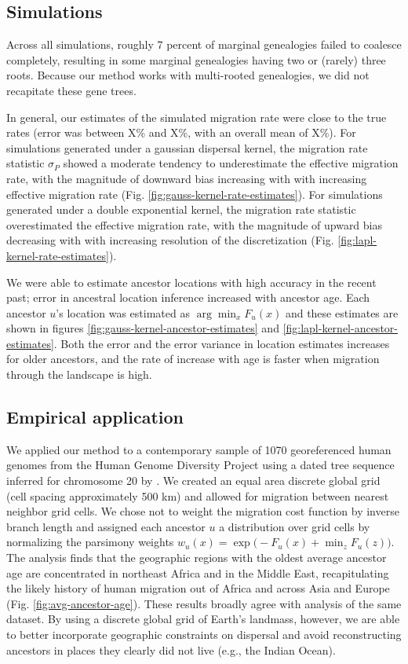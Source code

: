 \subsection{Simulations}

Across all simulations, roughly 7 percent of marginal genealogies failed to
coalesce completely, resulting in some marginal genealogies having two or (rarely)
three roots. Because our method works with multi-rooted genealogies, we did
not recapitate these gene trees.

In general, our estimates of the simulated migration rate were close to the 
true rates (error was between X\% and X\%, with an overall mean of X\%).
For simulations generated under a gaussian dispersal kernel, the migration
rate statistic $\sigma_P$ showed a moderate tendency to underestimate the 
effective migration rate, with the magnitude of downward bias increasing with 
with increasing effective migration rate 
(Fig. \ref{fig:gauss-kernel-rate-estimates}). For simulations generated under
a double exponential kernel, the migration rate statistic overestimated the
effective migration rate, with the magnitude of upward bias decreasing with 
with increasing resolution of the discretization
(Fig. \ref{fig:lapl-kernel-rate-estimates}).

We were able to estimate ancestor locations with high accuracy in the recent past; 
error in ancestral location inference increased with ancestor age.
Each ancestor $u$'s location was estimated as $\arg\min_x F_u(x)$ and these
estimates are shown in figures \ref{fig:gauss-kernel-ancestor-estimates} and 
\ref{fig:lapl-kernel-ancestor-estimates}. Both the error and the error variance
in location estimates increases for older ancestors, and the rate of increase
with age is faster when migration through the landscape is high. 

\subsection{Empirical application}

We applied our method to a contemporary sample of 1070 georeferenced human
genomes from the Human Genome Diversity Project using a dated tree sequence
inferred for chromosome 20 by \citet{Wohns_etal_2022}. We created an equal 
area discrete global grid \citep{Barnes_Sahr_2023} (cell spacing approximately 
500 km) and allowed for migration between nearest neighbor grid cells. We
chose not to weight the migration cost function by inverse branch length and
assigned each ancestor $u$ a distribution over grid cells by normalizing the 
parsimony weights $w_u(x) = \exp\bigl(-F_u(x) + \min_z F_u(z)\bigr)$.
The analysis finds that the geographic regions with the oldest average ancestor
age are concentrated in northeast Africa and in the Middle East, recapitulating
the likely history of human migration out of Africa and across Asia and Europe 
(Fig. \ref{fig:avg-ancestor-age}). These results broadly agree with 
\citet{Wohns_etal_2022} analysis of the same dataset. By using a discrete global 
grid of Earth's landmass, however, we are able to better incorporate geographic
constraints on dispersal and avoid reconstructing ancestors in places they
clearly did not live (e.g., the Indian Ocean).
